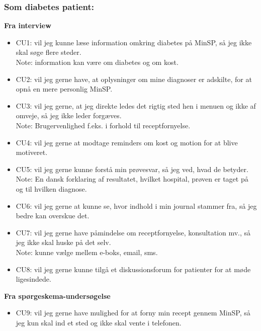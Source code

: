 \subsubsection*{Som diabetes patient:}
\textbf{Fra interview}\\
\begin{itemize}
\item CU1: vil jeg kunne læse information omkring diabetes på MinSP, så jeg ikke skal søge flere steder. \\
Note: information kan være om diabetes og om kost.
\item CU2: vil jeg gerne have, at oplysninger om mine diagnoser er adskilte, for at opnå en mere personlig MinSP. 
\item CU3: vil jeg gerne, at jeg direkte ledes det rigtig sted hen i menuen og ikke af omveje, så jeg ikke leder forgæves.\\ 
Note: Brugervenlighed f.eks. i forhold til receptfornyelse.
\item CU4: vil jeg gerne at modtage reminders om kost og motion for at blive motiveret.
\item CU5: vil jeg gerne kunne forstå min prøvesvar, så jeg ved, hvad de betyder. \\
Note: En dansk forklaring af resultatet, hvilket hospital, prøven er taget på og til hvilken diagnose. 
\item CU6: vil jeg gerne at kunne se, hvor indhold i min journal stammer fra, så jeg bedre kan overskue det.
\item CU7: vil jeg gerne have påmindelse om receptfornyelse, konsultation mv., så jeg ikke skal huske på det selv.\\ 
Note: kunne vælge mellem e-boks, email, sms.
\item CU8: vil jeg gerne kunne tilgå et diskussionsforum for patienter for at møde ligesindede.
\end{itemize}
\textbf{Fra spørgeskema-undersøgelse}\\
\begin{itemize}
\item CU9: vil jeg gerne have mulighed for at forny min recept gennem MinSP, så jeg kun skal ind et sted og ikke skal vente i telefonen.
\end{itemize}
%
%

